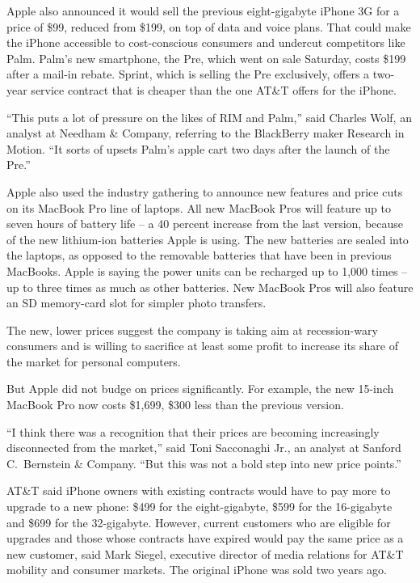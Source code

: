 \documentclass[12pt,a4paper,onecolumn]{article}
\begin{document}
Apple also announced it would sell the previous eight-gigabyte iPhone 3G for a price of \$99,
reduced from \$199, on top of data and voice plans. That could make the iPhone accessible to
cost-conscious consumers and undercut competitors like Palm. Palm's new smartphone, the Pre, which
went on sale Saturday, costs \$199 after a mail-in rebate. Sprint, which is selling the Pre
exclusively, offers a two-year service contract that is cheaper than the one AT\&T offers for the
iPhone.

``This puts a lot of pressure on the likes of RIM and Palm,'' said Charles Wolf, an analyst at
Needham \& Company, referring to the BlackBerry maker Research in Motion. ``It sorts of upsets
Palm's apple cart two days after the launch of the Pre.''

Apple also used the industry gathering to announce new features and price cuts on its MacBook Pro
line of laptops. All new MacBook Pros will feature up to seven hours of battery life -- a 40 percent
increase from the last version, because of the new lithium-ion batteries Apple is using. The new
batteries are sealed into the laptops, as opposed to the removable batteries that have been in
previous MacBooks. Apple is saying the power units can be recharged up to 1,000 times -- up to three
times as much as other batteries. New MacBook Pros will also feature an SD memory-card slot for
simpler photo transfers.

The new, lower prices suggest the company is taking aim at recession-wary consumers and is willing
to sacrifice at least some profit to increase its share of the market for personal computers.

But Apple did not budge on prices significantly. For example, the new 15-inch MacBook Pro now costs
\$1,699, \$300 less than the previous version.

``I think there was a recognition that their prices are becoming increasingly disconnected from the
market,'' said Toni Sacconaghi Jr., an analyst at Sanford C.~Bernstein \& Company. ``But this was
not a bold step into new price points.''

AT\&T said iPhone owners with existing contracts would have to pay more to upgrade to a new phone:
\$499 for the eight-gigabyte, \$599 for the 16-gigabyte and \$699 for the 32-gigabyte. However,
current customers who are eligible for upgrades and those whose contracts have expired would pay the
same price as a new customer, said Mark Siegel, executive director of media relations for AT\&T
mobility and consumer markets. The original iPhone was sold two years ago.
\end{document}
